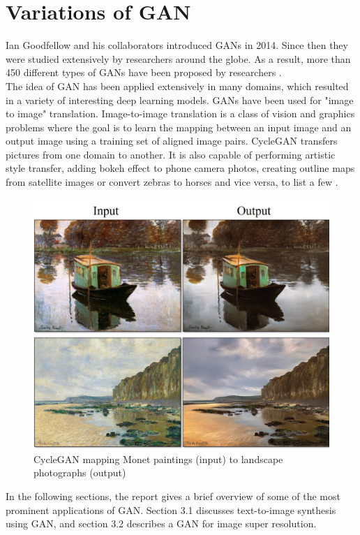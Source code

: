 \chapter{Variations of GAN}
\begin{onehalfspace}
    Ian Goodfellow and his collaborators introduced GANs in 2014. Since then 
    they were studied extensively by researchers around the globe. As a result, 
    more than 450 different types of GANs have been proposed by 
    researchers \cite{gan_list}. \\
    The idea of GAN has been applied extensively in many domains, which 
    resulted in a variety of interesting deep learning models. GANs have been 
    used for "image to image" translation. Image-to-image translation is a 
    class of vision and graphics problems where the goal is to learn the 
    mapping between an input image and an output image using a training set of 
    aligned image pairs. CycleGAN \cite{CycleGAN2017} transfers pictures from 
    one domain to another. 
    It is also capable of performing artistic style transfer, adding bokeh 
    effect to phone camera photos, creating outline maps from satellite images 
    or convert zebras to horses and vice versa, to list a few 
    \cite{cycleganprojectpage}.

    \begin{figure}[h]
        \centering
        \includegraphics[width=0.6\linewidth]{images/painting2photo.jpg}
        \caption{CycleGAN mapping Monet paintings (input) to landscape photographs (output)
        \cite{cycleganprojectpage}}
    \end{figure} 

    In the following sections, the report gives a brief overview of 
    some of the most prominent applications of GAN. Section 3.1 discusses 
    text-to-image synthesis using GAN, and section 3.2 describes a GAN for 
    image super resolution.


\end{onehalfspace}
